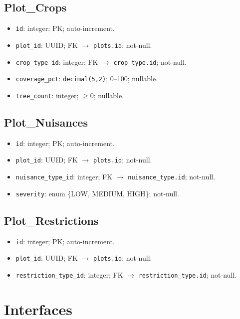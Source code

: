 \documentclass[12pt,oneside]{report}
\begin{document}
\subsection{Plot\_Crops}
\begin{itemize}[leftmargin=*,itemsep=2pt]
  \item \texttt{id}: integer; PK; auto-increment.
  \item \texttt{plot\_id}: UUID; FK $\rightarrow$ \texttt{plots.id}; not-null.
  \item \texttt{crop\_type\_id}: integer; FK $\rightarrow$ \texttt{crop\_type.id}; not-null.
  \item \texttt{coverage\_pct}: \texttt{decimal(5,2)}; 0–100; nullable.
  \item \texttt{tree\_count}: integer; $\geq 0$; nullable.
\end{itemize}

\subsection{Plot\_Nuisances}
\begin{itemize}[leftmargin=*,itemsep=2pt]
  \item \texttt{id}: integer; PK; auto-increment.
  \item \texttt{plot\_id}: UUID; FK $\rightarrow$ \texttt{plots.id}; not-null.
  \item \texttt{nuisance\_type\_id}: integer; FK $\rightarrow$ \texttt{nuisance\_type.id}; not-null.
  \item \texttt{severity}: enum \{LOW, MEDIUM, HIGH\}; not-null.
\end{itemize}

\subsection{Plot\_Restrictions}
\begin{itemize}[leftmargin=*,itemsep=2pt]
  \item \texttt{id}: integer; PK; auto-increment.
  \item \texttt{plot\_id}: UUID; FK $\rightarrow$ \texttt{plots.id}; not-null.
  \item \texttt{restriction\_type\_id}: integer; FK $\rightarrow$ \texttt{restriction\_type.id}; not-null.
\end{itemize}


\section{Interfaces}
\end{document}
